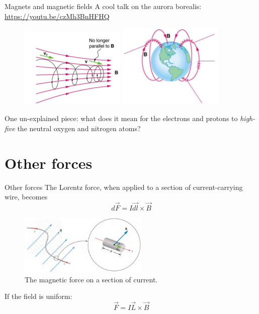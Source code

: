 \documentclass{beamer}
\begin{document}
\begin{frame}{Magnets and magnetic fields}
A cool talk on the aurora borealis:
\url{https://youtu.be/czMh3BnHFHQ} \\
\begin{figure}
\centering
\includegraphics[width=0.45\textwidth]{figures/mag1.png}
\includegraphics[width=0.45\textwidth]{figures/mag2.png}
\end{figure}
One un-explained piece: what does it mean for the electrons and protons to \textit{high-five} the neutral oxygen and nitrogen atoms?
\end{frame}

\section{Other forces}

\begin{frame}{Other forces}
The Lorentz force, when applied to a section of current-carrying wire, becomes
\begin{equation}
d\vec{F} = I \vec{dl} \times \vec{B}
\end{equation}
\begin{figure}
\centering
\includegraphics[width=0.55\textwidth]{figures/current.png}
\caption{\label{fig:current} The magnetic force on a section of current.}
\end{figure}
If the field is uniform:
\begin{equation}
\vec{F} = I \vec{L} \times \vec{B}
\end{equation}
\end{frame}
\end{document}
